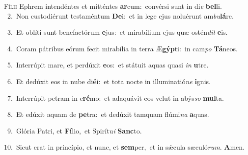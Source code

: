 \lettrine{\initial\textcolor{\initialcolor}{F}}{ílii} Ephrem intendéntes et mitténtes \textbf{ar}\-cum:~\star convérsi sunt in di\textit{e} \textbf{bel}\-li.\\
{\numbfont\textcolor{\numbcolor}{~2.}}~Non custodiérunt testaméntum \textbf{De}\-i:~\star et in lege ejus noluérunt am\-\textit{bu}\-\textbf{lá}re.\par
{\numbfont\textcolor{\numbcolor}{~3.}}~Et oblíti sunt benefactórum \textbf{e}\-jus:~\star et mirabílium ejus quæ ostén\textit{dit} \textbf{e}\-is.\par
{\numbfont\textcolor{\numbcolor}{~4.}}~Coram pátribus eórum fecit mirabília in terra Æ\-\textbf{gýp}\-ti:~\star in cam\textit{po} \textbf{Tá}\-neos.\par
{\numbfont\textcolor{\numbcolor}{~5.}}~Interrúpit mare, et perdúxit \textbf{e}\-os:~\star et státuit aquas quasi \textit{in} \textbf{u}\-tre.\par
{\numbfont\textcolor{\numbcolor}{~6.}}~Et dedúxit eos in nube di\-\textbf{é}\-i:~\star et tota nocte in illuminatió\textit{ne} \textbf{i}\-gnis.\par
{\numbfont\textcolor{\numbcolor}{~7.}}~Interrúpit petram in e\-\textbf{ré}\-mo:~\star et adaquávit eos velut in abýs\textit{so} \textbf{mul}\-ta.\par
{\numbfont\textcolor{\numbcolor}{~8.}}~Et edúxit aquam de \textbf{pe}\-tra:~\star et dedúxit tamquam flúmi\textit{na} \textbf{a}\-quas.\par
{\numbfont\textcolor{\numbcolor}{~9.}}~Glória Patri, et \textbf{Fí}\-lio,~\star et Spirítu\textit{i} \textbf{Sanc}\-to.\par
{\numbfont\textcolor{\numbcolor}{10.}}~Sicut erat in princípio, et nunc, et \textbf{sem}\-per,~\star et in sǽcula sæculó\-\textit{rum}\-. \textbf{A}\-men.\par
